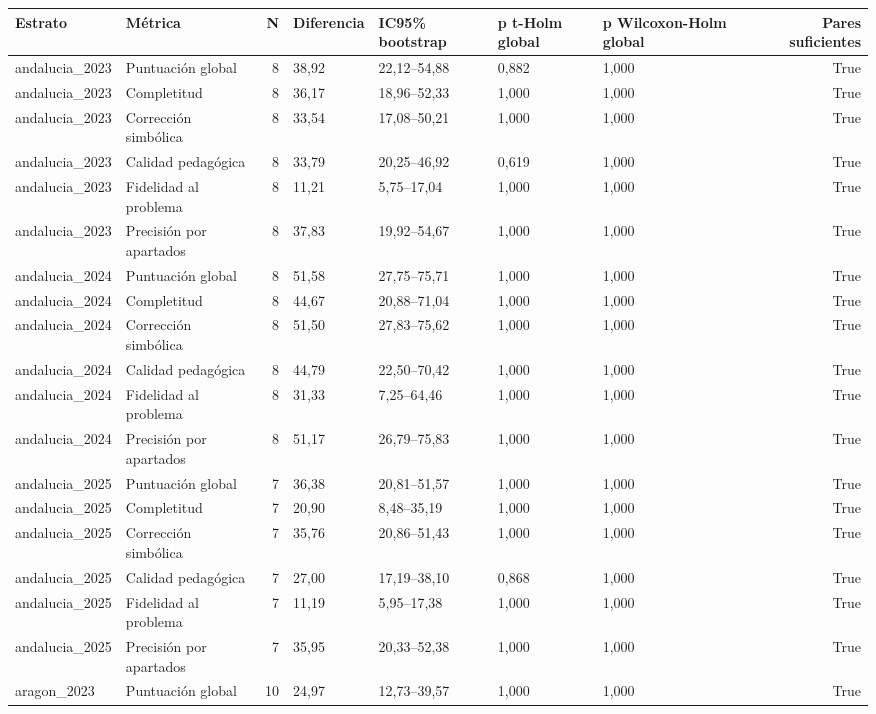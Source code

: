 \begin{tabular}{llrllllr}
\toprule
Estrato & Métrica & N & Diferencia & IC95\% bootstrap & p t-Holm global & p Wilcoxon-Holm global & Pares suficientes \\
\midrule
andalucia\_2023 & Puntuación global & 8 & 38,92 & 22,12–54,88 & 0,882 & 1,000 & True \\
andalucia\_2023 & Completitud & 8 & 36,17 & 18,96–52,33 & 1,000 & 1,000 & True \\
andalucia\_2023 & Corrección simbólica & 8 & 33,54 & 17,08–50,21 & 1,000 & 1,000 & True \\
andalucia\_2023 & Calidad pedagógica & 8 & 33,79 & 20,25–46,92 & 0,619 & 1,000 & True \\
andalucia\_2023 & Fidelidad al problema & 8 & 11,21 & 5,75–17,04 & 1,000 & 1,000 & True \\
andalucia\_2023 & Precisión por apartados & 8 & 37,83 & 19,92–54,67 & 1,000 & 1,000 & True \\
andalucia\_2024 & Puntuación global & 8 & 51,58 & 27,75–75,71 & 1,000 & 1,000 & True \\
andalucia\_2024 & Completitud & 8 & 44,67 & 20,88–71,04 & 1,000 & 1,000 & True \\
andalucia\_2024 & Corrección simbólica & 8 & 51,50 & 27,83–75,62 & 1,000 & 1,000 & True \\
andalucia\_2024 & Calidad pedagógica & 8 & 44,79 & 22,50–70,42 & 1,000 & 1,000 & True \\
andalucia\_2024 & Fidelidad al problema & 8 & 31,33 & 7,25–64,46 & 1,000 & 1,000 & True \\
andalucia\_2024 & Precisión por apartados & 8 & 51,17 & 26,79–75,83 & 1,000 & 1,000 & True \\
andalucia\_2025 & Puntuación global & 7 & 36,38 & 20,81–51,57 & 1,000 & 1,000 & True \\
andalucia\_2025 & Completitud & 7 & 20,90 & 8,48–35,19 & 1,000 & 1,000 & True \\
andalucia\_2025 & Corrección simbólica & 7 & 35,76 & 20,86–51,43 & 1,000 & 1,000 & True \\
andalucia\_2025 & Calidad pedagógica & 7 & 27,00 & 17,19–38,10 & 0,868 & 1,000 & True \\
andalucia\_2025 & Fidelidad al problema & 7 & 11,19 & 5,95–17,38 & 1,000 & 1,000 & True \\
andalucia\_2025 & Precisión por apartados & 7 & 35,95 & 20,33–52,38 & 1,000 & 1,000 & True \\
aragon\_2023 & Puntuación global & 10 & 24,97 & 12,73–39,57 & 1,000 & 1,000 & True \\

\end{tabular}
